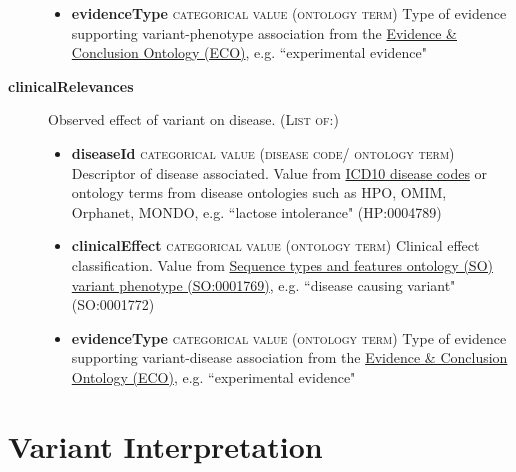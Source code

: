 \documentclass[a4paper, 10pt]{article}        %
\begin{document}
\begin{description}
\begin{itemize}
				\item[] \textbf{evidenceType} {\textsc{categorical value (ontology term)}} Type of evidence supporting variant-phenotype association from the \href{http://purl.obolibrary.org/obo/eco.owl}{Evidence \& Conclusion Ontology (ECO)}, e.g. ``experimental evidence"
	\end{itemize} 
\item[\textbf{clinicalRelevances}] Observed effect of variant on disease. {\textsc{(List of:)}}
	\begin{itemize}
				\item[] \textbf{diseaseId} {\textsc{categorical value (disease code/ ontology term)}} Descriptor of disease associated. Value from \href{https://www.who.int/classifications/icd/en/}{ICD10 disease codes} or ontology terms from disease ontologies such as HPO, OMIM, Orphanet, MONDO, e.g. ``lactose intolerance" (HP:0004789)
				\item[]  \textbf{clinicalEffect} {\textsc{categorical value (ontology term)}} Clinical effect classification. Value from \href{http://purl/obolibrary.org/obo/SO_0001769}{Sequence types and features ontology (SO) variant phenotype (SO:0001769)}, e.g. ``disease causing variant" (SO:0001772)
				\item[]  \textbf{evidenceType} {\textsc{categorical value (ontology term)}} Type of evidence supporting variant-disease association from the \href{http://purl.obolibrary.org/obo/eco.owl}{Evidence \& Conclusion Ontology (ECO)}, e.g. ``experimental evidence"
	\end{itemize} 
 \end{description}
 
 
 
    	
\section*{ {\color{teal} Variant Interpretation}}
  
\end{document}
